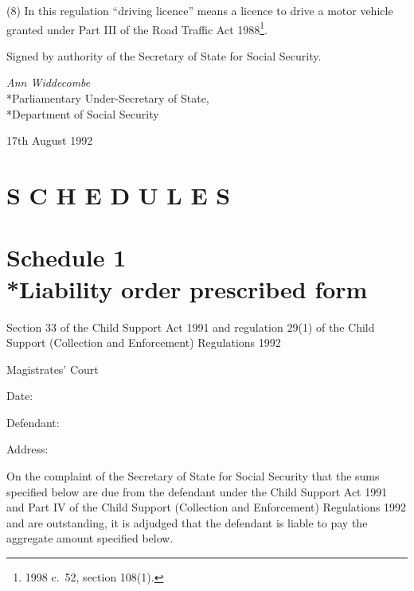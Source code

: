 \documentclass[12pt,a4paper]{article}
\begin{document}
(8) In this regulation “driving licence” means a licence to drive a motor vehicle granted under Part III of the Road Traffic Act 1988\footnote{1998 c.\ 52, section 108(1).}.


\bigskip

Signed by authority of the Secretary of State for Social Security.

{\raggedleft
\emph{Ann Widdecombe}\\*Parliamentary Under-Secretary of State,\\*Department of Social Security

}

17th August 1992

\small

\part*{S C H E D U L E S}

\part[Schedule 1 --- Liability order prescribed form]{Schedule 1\\*Liability order prescribed form}

\renewcommand\parthead{--- Schedule 1}

\noindent
Section 33 of the Child Support Act 1991 and regulation 29(1) of the Child Support (Collection and Enforcement) Regulations 1992

\medskip

{\raggedleft \hspace{0.5\linewidth}\dotfill Magistrates' Court

}

\medskip

Date:

\medskip

Defendant:

\medskip

Address:

\medskip

On the complaint of the Secretary of State for Social Security that the sums specified below are due from the defendant under the Child Support Act 1991 and Part IV of the Child Support (Collection and Enforcement) Regulations 1992 and are outstanding, it is adjudged that the defendant is liable to pay the aggregate amount specified below.
\end{document}

